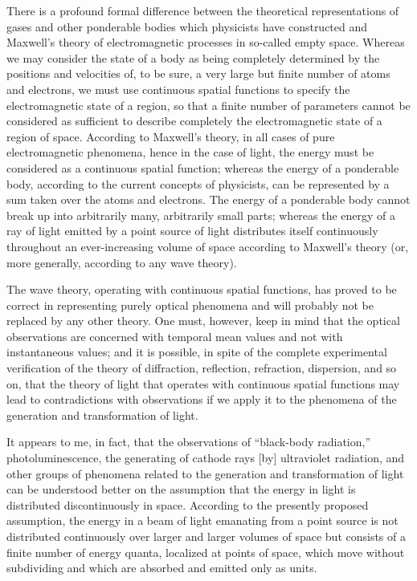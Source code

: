 There is a profound formal difference between the theoretical
representations of gases and other ponderable bodies which physicists
have constructed and Maxwell's theory of electromagnetic processes in
so-called empty space. Whereas we may consider the state of a body as
being completely determined by the positions and velocities of, to be
sure, a very large but finite number of atoms and electrons, we must use
continuous spatial functions to specify the electromagnetic state of a
region, so that a finite number of parameters cannot be considered as
sufficient to describe completely the electromagnetic state of a region
of space. According to Maxwell's theory, in all cases of pure
electromagnetic phenomena, hence in the case of light, the energy must
be considered as a continuous spatial function; whereas the energy of a
ponderable body, according to the current concepts of physicists, can be
represented by a sum taken over the atoms and electrons. The energy of a
ponderable body cannot break up into arbitrarily many, arbitrarily small
parts; whereas the energy of a ray of light emitted by a point source of
light distributes itself continuously throughout an ever-increasing
volume of space according to Maxwell's theory (or, more generally,
according to any wave theory).

The wave theory, operating with continuous spatial functions, has proved
to be correct in representing purely optical phenomena and will probably
not be replaced by any other theory. One must, however, keep in mind
that the optical observations are concerned with temporal mean values
and not with instantaneous values; and it is possible, in spite of the
complete experimental verification of the theory of diffraction,
reflection, refraction, dispersion, and so on, that the theory of light
that operates with continuous spatial functions may lead to
contradictions with observations if we apply it to the phenomena of the
generation and transformation of light.

It appears to me, in fact, that the observations of ``black-body
radiation,'' photoluminescence, the generating of cathode rays {[}by{]}
ultraviolet radiation, and other groups of phenomena related to the
generation and transformation of light can be understood better on the
assumption that the energy in light is distributed discontinuously in
space. According to the presently proposed assumption, the energy in a
beam of light emanating from a point source is not distributed
continuously over larger and larger volumes of space but consists of a
finite number of energy quanta, localized at points of space, which move
without subdividing and which are absorbed and emitted only as units.

